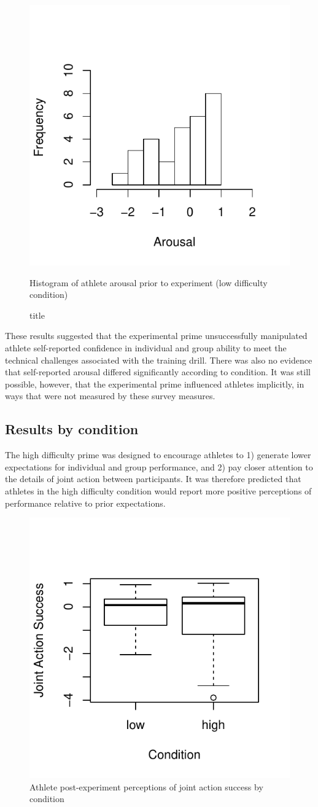 \begin{figure}
  \centering
  \includegraphics[width=0.5\linewidth,keepaspectratio] {images/histArousalFactorPreLow-1}
      \caption{Histogram of athlete arousal prior to experiment (low difficulty condition)}
  \caption{title}
    \label{fig:histArousalFactorPreLow}
\end{figure}

These results suggested that the experimental prime unsuccessfully
manipulated athlete self-reported confidence in individual and group ability to meet the technical challenges associated with the training drill.  There was also no evidence that self-reported arousal differed significantly according to condition. It was still possible, however, that the experimental prime influenced athletes implicitly, in ways that were not measured by these survey measures.


\subsection{Results by condition}
The high difficulty prime was designed to encourage athletes to 1) generate lower expectations for individual and group performance, and 2) pay closer attention to the details of joint action between participants.  It was therefore predicted that athletes in the high difficulty condition would report more positive perceptions of performance relative to prior expectations.


\begin{figure}
    \centering \includegraphics[width=0.5\linewidth,keepaspectratio] {images/groupJointActionSuccessPostBoxPlot-1}
    \caption{Athlete post-experiment perceptions of joint action success by condition}
              \label{fig:groupJointActionSuccessPostBoxPlot}
\end{figure}

